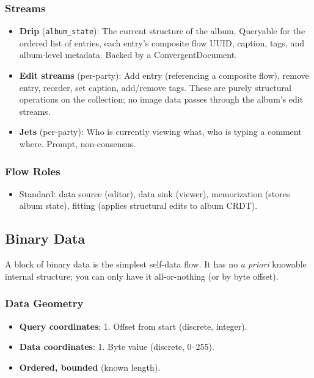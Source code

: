 \documentclass[11pt, letterpaper]{article}
\begin{document}
\subsubsection{Streams}
\begin{itemize}[leftmargin=2em]
  \item \textbf{Drip} (\texttt{album\_state}): The current structure of the album.
    Queryable for the ordered list of entries, each entry's composite flow UUID, caption,
    tags, and album-level metadata. Backed by a ConvergentDocument.
  \item \textbf{Edit streams} (per-party): Add entry (referencing a composite flow),
    remove entry, reorder, set caption, add/remove tags. These are purely structural
    operations on the collection; no image data passes through the album's edit streams.
  \item \textbf{Jets} (per-party): Who is currently viewing what, who is typing a
    comment where. Prompt, non-consensus.
\end{itemize}

\subsubsection{Flow Roles}
\begin{itemize}[leftmargin=2em]
  \item Standard: data source (editor), data sink (viewer), memorization (stores album
    state), fitting (applies structural edits to album CRDT).
\end{itemize}

\subsection{Binary Data}
\label{sec:ex-binary}

A block of binary data is the simplest self-data flow. It has no \emph{a priori}
knowable internal structure; you can only have it all-or-nothing (or by byte offset).

\subsubsection{Data Geometry}
\begin{itemize}[leftmargin=2em]
  \item \textbf{Query coordinates}: 1. Offset from start (discrete, integer).
  \item \textbf{Data coordinates}: 1. Byte value (discrete, 0--255).
  \item \textbf{Ordered, bounded} (known length).
\end{itemize}
\end{document}
